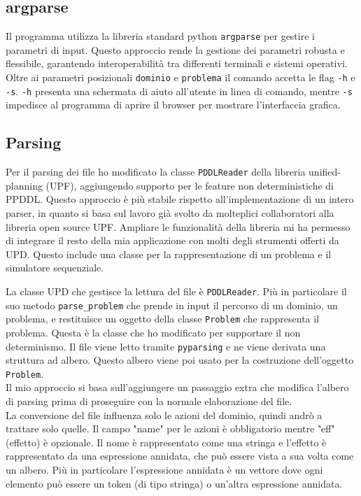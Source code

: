 \documentclass[a4paper, 11pt, titlepage, twoside, openany]{book}
\begin{document}
\subsection{argparse} Il programma utilizza la libreria standard python \texttt{argparse} per gestire i parametri di input. Questo approccio rende la gestione dei parametri robusta e flessibile, garantendo interoperabilità tra differenti terminali e sistemi operativi. \\
Oltre ai parametri posizionali \texttt{dominio} e \texttt{problema} il comando accetta le flag \texttt{-h} e \texttt{-s}. \texttt{-h} presenta una schermata di aiuto all'utente in linea di comando, mentre \texttt{-s} impedisce al programma di aprire il browser per mostrare l'interfaccia grafica.

\subsection{Parsing} Per il parsing dei file ho modificato la classe \texttt{PDDLReader} della libreria unified-planning (UPF), aggiungendo supporto per le feature non deterministiche di PPDDL. Questo approccio è più stabile rispetto all'implementazione di un intero parser, in quanto si basa sul lavoro già svolto da molteplici collaboratori alla libreria open source UPF. Ampliare le funzionalità della libreria mi ha permesso di integrare il resto della mia applicazione con molti degli strumenti offerti da UPD. Questo include una classe per la rappresentazione di un problema e il simulatore sequenziale.

La classe UPD che gestisce la lettura del file è \texttt{PDDLReader}. Più in particolare il suo metodo \texttt{parse\_problem} che prende in input il percorso di un dominio, un problema, e restituisce un oggetto della classe \texttt{Problem} che rappresenta il problema. Questa è la classe che ho modificato per supportare il non determinismo.
Il file viene letto tramite \texttt{pyparsing} e ne viene derivata una struttura ad albero. Questo albero viene poi usato per la costruzione dell'oggetto \texttt{Problem}. \\
Il mio approccio si basa sull'aggiungere un passaggio extra che modifica l'albero di parsing prima di proseguire con la normale elaborazione del file. \\
La conversione del file influenza solo le azioni del dominio, quindi andrò a trattare solo quelle. Il campo "name" per le azioni è obbligatorio mentre "eff" (effetto) è opzionale. Il nome è rappresentato come una stringa e l'effetto è rappresentato da una espressione annidata, che può essere vista a sua volta come un albero. Più in particolare l'espressione annidata è un vettore dove ogni elemento può essere un token (di tipo stringa) o un'altra espressione annidata.
\end{document}
